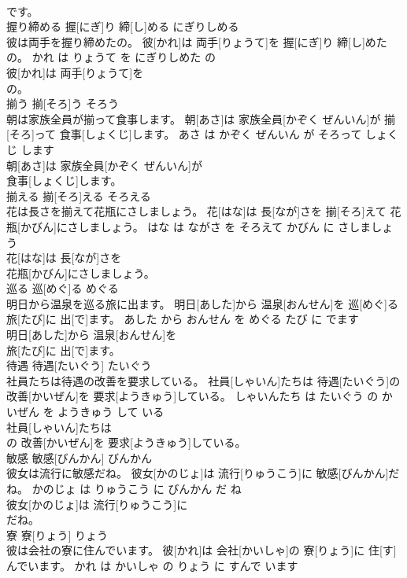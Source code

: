 \documentclass[8pt]{extreport}
\begin{document}
\begin{CJK}{UTF8}{min}
\\	です。			
\\	握り締める	握[にぎ]り 締[し]める	にぎりしめる	
\\	彼は両手を握り締めたの。	彼[かれ]は 両手[りょうて]を 握[にぎ]り 締[し]めたの。	かれ は りょうて を にぎりしめた の	
\\	彼[かれ]は 両手[りょうて]を
\\	の。			
\\	揃う	揃[そろ]う	そろう	
\\	朝は家族全員が揃って食事します。	朝[あさ]は 家族全員[かぞく ぜんいん]が 揃[そろ]って 食事[しょくじ]します。	あさ は かぞく ぜんいん が そろって しょくじ します	
\\	朝[あさ]は 家族全員[かぞく ぜんいん]が
\\	食事[しょくじ]します。			
\\	揃える	揃[そろ]える	そろえる	
\\	花は長さを揃えて花瓶にさしましょう。	花[はな]は 長[なが]さを 揃[そろ]えて 花瓶[かびん]にさしましょう。	はな は ながさ を そろえて かびん に さしましょう	
\\	花[はな]は 長[なが]さを
\\	花瓶[かびん]にさしましょう。			
\\	巡る	巡[めぐ]る	めぐる	
\\	明日から温泉を巡る旅に出ます。	明日[あした]から 温泉[おんせん]を 巡[めぐ]る 旅[たび]に 出[で]ます。	あした から おんせん を めぐる たび に でます	
\\	明日[あした]から 温泉[おんせん]を
\\	旅[たび]に 出[で]ます。			
\\	待遇	待遇[たいぐう]	たいぐう	
\\	社員たちは待遇の改善を要求している。	社員[しゃいん]たちは 待遇[たいぐう]の 改善[かいぜん]を 要求[ようきゅう]している。	しゃいんたち は たいぐう の かいぜん を ようきゅう して いる	
\\	社員[しゃいん]たちは
\\	の 改善[かいぜん]を 要求[ようきゅう]している。			
\\	敏感	敏感[びんかん]	びんかん	
\\	彼女は流行に敏感だね。	彼女[かのじょ]は 流行[りゅうこう]に 敏感[びんかん]だね。	かのじょ は りゅうこう に びんかん だ ね	
\\	彼女[かのじょ]は 流行[りゅうこう]に
\\	だね。			
\\	寮	寮[りょう]	りょう	
\\	彼は会社の寮に住んでいます。	彼[かれ]は 会社[かいしゃ]の 寮[りょう]に 住[す]んでいます。	かれ は かいしゃ の りょう に すんで います	

\end{CJK}
\end{document}
